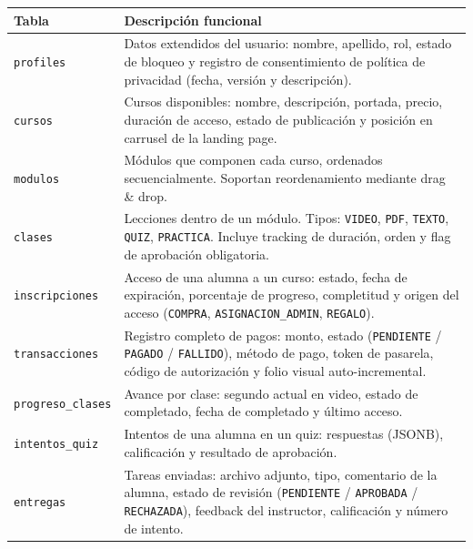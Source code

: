 \documentclass[a4paper,11pt]{article}
\begin{document}
\renewcommand{\arraystretch}{1.3}
\begin{longtable}{L{3.8cm} L{10.8cm}}
\toprule
\textbf{Tabla} & \textbf{Descripci\'on funcional} \\
\midrule
\endhead
\bottomrule
\endfoot

\texttt{profiles} &
  Datos extendidos del usuario: nombre, apellido, rol, estado de bloqueo
  y registro de consentimiento de pol\'itica de privacidad
  (fecha, versi\'on y descripci\'on). \\

\texttt{cursos} &
  Cursos disponibles: nombre, descripci\'on, portada, precio, duraci\'on
  de acceso, estado de publicaci\'on y posici\'on en carrusel de la
  landing page. \\

\texttt{modulos} &
  M\'odulos que componen cada curso, ordenados secuencialmente.
  Soportan reordenamiento mediante drag \& drop. \\

\texttt{clases} &
  Lecciones dentro de un m\'odulo. Tipos: \texttt{VIDEO}, \texttt{PDF},
  \texttt{TEXTO}, \texttt{QUIZ}, \texttt{PRACTICA}. Incluye tracking de
  duraci\'on, orden y flag de aprobaci\'on obligatoria. \\

\texttt{inscripciones} &
  Acceso de una alumna a un curso: estado, fecha de expiraci\'on,
  porcentaje de progreso, completitud y origen del acceso
  (\texttt{COMPRA}, \texttt{ASIGNACION\_ADMIN}, \texttt{REGALO}). \\

\texttt{transacciones} &
  Registro completo de pagos: monto, estado (\texttt{PENDIENTE} /
  \texttt{PAGADO} / \texttt{FALLIDO}), m\'etodo de pago, token de
  pasarela, c\'odigo de autorizaci\'on y folio visual auto-incremental. \\

\texttt{progreso\_clases} &
  Avance por clase: segundo actual en video, estado de completado,
  fecha de completado y \'ultimo acceso. \\

\texttt{intentos\_quiz} &
  Intentos de una alumna en un quiz: respuestas (JSONB), calificaci\'on
  y resultado de aprobaci\'on. \\

\texttt{entregas} &
  Tareas enviadas: archivo adjunto, tipo, comentario de la alumna,
  estado de revisi\'on (\texttt{PENDIENTE} / \texttt{APROBADA} /
  \texttt{RECHAZADA}), feedback del instructor, calificaci\'on
  y n\'umero de intento. \\


\end{longtable}
\end{document}
